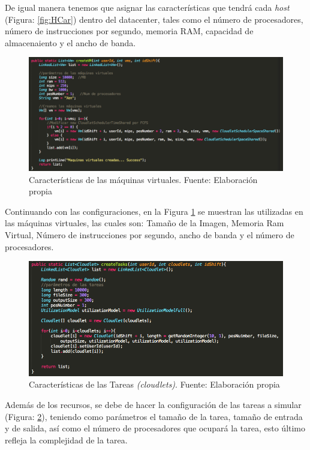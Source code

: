 De igual manera tenemos que asignar las características que tendrá cada \textit{host} (Figura: \ref{fig:HCar}) dentro del datacenter, tales como el número de procesadores, número de instrucciones por segundo, memoria RAM, capacidad de almacenaiento y el ancho de banda.

\renewcommand\thefigure{\arabic{figure}}
\begin{figure}[h!]
	\centering
	\includegraphics[scale=0.4]{media/creacion_vm}
	\caption{Características de las máquinas virtuales. Fuente: Elaboración propia}
	\label{fig:VCar}
\end{figure}

Continuando con las configuraciones, en la Figura \ref{fig:VCar} se muestran las utilizadas en las máquinas virtuales, las cuales son: Tamaño de la Imagen, Memoria Ram Virtual, Número de instrucciones por segundo, ancho de banda y el número de procesadores.

\renewcommand\thefigure{\arabic{figure}}
\begin{figure}[h!]
	\centering
	\includegraphics[scale=0.4]{media/creacion_cloudlet}
	\caption{Características de las Tareas \textit{(cloudlets)}. Fuente: Elaboración propia}
	\label{fig:TCar}
\end{figure} 

Además de los recursos, se debe de hacer la configuración de las tareas a simular (Figura: \ref{fig:TCar}), teniendo como parámetros el tamaño de la tarea, tamaño de entrada y de salida, así como el número de procesadores que ocupará la tarea, esto último refleja la complejidad de la tarea.


